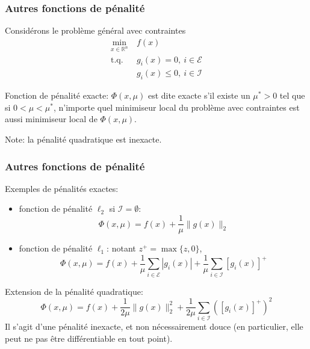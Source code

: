 \documentclass[t,usepdftitle=false,aspectratio=169]{beamer}
\def\red{\color{red}}
\def\cE{\mathcal{E}}
\def\cI{\mathcal{I}}
\def\RR{\mathbb{R}}
\begin{document}
\begin{frame}
\frametitle{Autres fonctions de pénalité}

Considérons le problème général avec contraintes
\begin{align*}
\min_{x \in \RR^n}\ & f(x) \\
\mbox{t.q. } & g_i(x) = 0,\ i \in \cE \\
& g_i(x) \leq 0,\ i \in \cI
\end{align*}

{\red Fonction de pénalité exacte}: $\Phi(x, \mu)$ est dite exacte s'il existe un $\mu^* > 0$ tel que si $0< \mu < \mu^*$, n'importe quel minimiseur local du problème avec contraintes est aussi minimiseur local de $\Phi(x, \mu)$.

\mbox{}

Note: la pénalité quadratique est inexacte.

\end{frame}

\begin{frame}
\frametitle{Autres fonctions de pénalité}

Exemples de pénalités exactes:
\begin{itemize}
\item 
fonction de pénalité $\ell_2$ si $\cI = \emptyset$:
$$
\Phi(x, \mu) = f(x) + \frac{1}{\mu} \| g(x) \|_2
$$
\item 
fonction de pénalité $\ell_1$:
notant $z^+ = \max\{z, 0\}$,
$$
\Phi(x, \mu) = f(x) + \frac{1}{\mu} \sum_{i \in \cE} | g_i(x) | + \frac{1}{\mu} \sum_{i \in \cI} [ g_i(x) ]^+
$$
\end{itemize}


Extension de la pénalité quadratique:
$$
\Phi(x, \mu) = f(x) + \frac{1}{2\mu} \| g(x) \|^2_2
+ \frac{1}{2\mu} \sum_{i \in \cI} \left( [ g_i(x) ]^+ \right)^2
$$
Il s'agit d'une pénalité inexacte, et non nécessairement douce (en particulier, elle peut ne pas être différentiable en tout point).

\end{frame}
\end{document}

